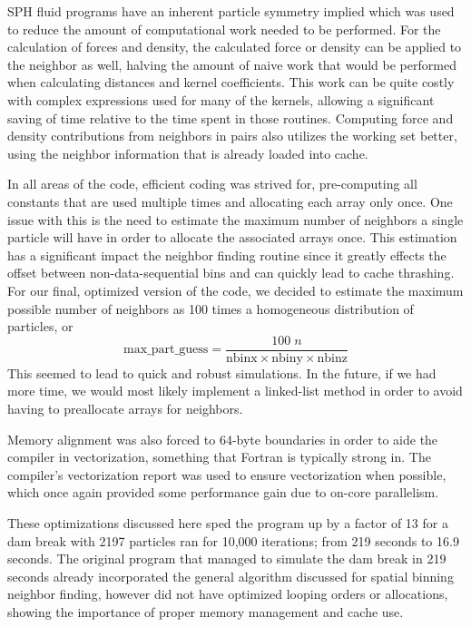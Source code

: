 \documentclass{scrartcl}
\begin{document}
	SPH fluid programs have an inherent particle symmetry implied which was used to reduce the amount of computational work needed to be performed. For the calculation of forces and density, the calculated force or density can be applied to the neighbor as well, halving the amount of naive work that would be performed when calculating distances and kernel coefficients. This work can be quite costly with complex expressions used for many of the kernels, allowing a significant saving of time relative to the time spent in those routines. Computing force and density contributions from neighbors in pairs also utilizes the working set better, using the neighbor information that is already loaded into cache. 
	
	In all areas of the code, efficient coding was strived for, pre-computing all constants that are used multiple times and allocating each array only once. One issue with this is the need to estimate the maximum number of neighbors a single particle will have in order to allocate the associated arrays once. This estimation has a significant impact the neighbor finding routine since it greatly effects the offset between non-data-sequential bins and can quickly lead to cache thrashing. For our final, optimized version of the code, we decided to estimate the maximum possible number of neighbors as 100 times a homogeneous distribution of particles, or
	\begin{equation}
	\mathrm{max\_part\_guess} = \frac{100 \; n}{\mathrm{nbinx} \times \mathrm{nbiny} \times \mathrm{nbinz}}
	\end{equation}
	This seemed to lead to quick and robust simulations. In the future, if we had more time, we would most likely implement a linked-list method in order to avoid having to preallocate arrays for neighbors.
	
	Memory alignment was also forced to 64-byte boundaries in order to aide the compiler in vectorization, something that Fortran is typically strong in. The compiler's vectorization report was used to ensure vectorization when possible, which once again provided some performance gain due to on-core parallelism.
	
	These optimizations discussed here sped the program up by a factor of 13 for a dam break with 2197 particles ran for 10,000 iterations; from 219 seconds to 16.9 seconds. The original program that managed to simulate the dam break in 219 seconds already incorporated the general algorithm discussed for spatial binning neighbor finding, however did not have optimized looping orders or allocations, showing the importance of proper memory management and cache use.
      
\end{document}
